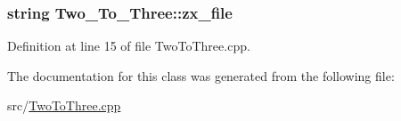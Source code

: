 \subsubsection[{\texorpdfstring{zx\+\_\+file}{zx_file}}]{\setlength{\rightskip}{0pt plus 5cm}string Two\+\_\+\+To\+\_\+\+Three\+::zx\+\_\+file}\hypertarget{class_two___to___three_a102a4276583a481691dd6f717a81e11e}{}\label{class_two___to___three_a102a4276583a481691dd6f717a81e11e}


Definition at line 15 of file Two\+To\+Three.\+cpp.



The documentation for this class was generated from the following file\+:\begin{DoxyCompactItemize}
\item 
src/\hyperlink{_two_to_three_8cpp}{Two\+To\+Three.\+cpp}\end{DoxyCompactItemize}
